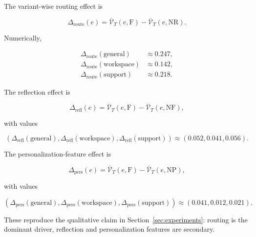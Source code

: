 \documentclass{article} %
\begin{document}
The variant-wise routing effect is

\begin{equation}
\label{eq:app-routing-effect}
\Delta_{\mathrm{route}}(e) = \bar{\mathcal{V}}_T(e,\mathrm{F}) - \bar{\mathcal{V}}_T(e,\mathrm{NR}).
\end{equation}

Numerically,

\begin{equation}
\label{eq:app-routing-numbers}
\begin{aligned}
\Delta_{\mathrm{route}}(\mathrm{general}) &\approx 0.247,\\
\Delta_{\mathrm{route}}(\mathrm{workspace}) &\approx 0.142,\\
\Delta_{\mathrm{route}}(\mathrm{support}) &\approx 0.218.
\end{aligned}
\end{equation}

The reflection effect is

\begin{equation}
\label{eq:app-reflection-effect}
\Delta_{\mathrm{refl}}(e) = \bar{\mathcal{V}}_T(e,\mathrm{F}) - \bar{\mathcal{V}}_T(e,\mathrm{NF}),
\end{equation}

with values

\begin{equation}
\label{eq:app-reflection-numbers}
(\Delta_{\mathrm{refl}}(\mathrm{general}),\Delta_{\mathrm{refl}}(\mathrm{workspace}),\Delta_{\mathrm{refl}}(\mathrm{support}))
\approx (0.052, 0.041, 0.056).
\end{equation}

The personalization-feature effect is

\begin{equation}
\label{eq:app-pers-effect}
\Delta_{\mathrm{pers}}(e) = \bar{\mathcal{V}}_T(e,\mathrm{F}) - \bar{\mathcal{V}}_T(e,\mathrm{NP}),
\end{equation}

with values

\begin{equation}
\label{eq:app-pers-numbers}
(\Delta_{\mathrm{pers}}(\mathrm{general}),\Delta_{\mathrm{pers}}(\mathrm{workspace}),\Delta_{\mathrm{pers}}(\mathrm{support}))
\approx (0.041, 0.012, 0.021).
\end{equation}

These reproduce the qualitative claim in Section~\ref{sec:experiments}: routing is the dominant driver, reflection and personalization features are secondary.
\end{document}
